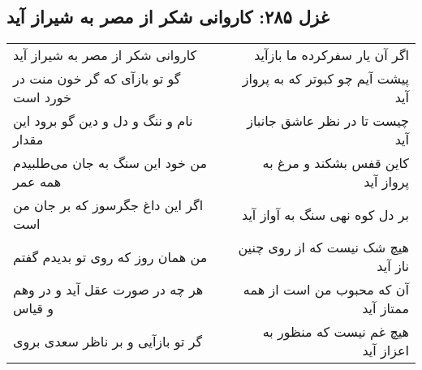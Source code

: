 \begin{center}
\section*{غزل ۲۸۵: کاروانی شکر از مصر به شیراز آید}
\label{sec:285}
\begin{longtable}{l p{0.5cm} r}
کاروانی شکر از مصر به شیراز آید
&&
اگر آن یار سفرکرده ما بازآید
\\
گو تو بازآی که گر خون منت در خورد است
&&
پیشت آیم چو کبوتر که به پرواز آید
\\
نام و ننگ و دل و دین گو برود این مقدار
&&
چیست تا در نظر عاشق جانباز آید
\\
من خود این سنگ به جان می‌طلبیدم همه عمر
&&
کاین قفس بشکند و مرغ به پرواز آید
\\
اگر این داغ جگرسوز که بر جان من است
&&
بر دل کوه نهی سنگ به آواز آید
\\
من همان روز که روی تو بدیدم گفتم
&&
هیچ شک نیست که از روی چنین ناز آید
\\
هر چه در صورت عقل آید و در وهم و قیاس
&&
آن که محبوب من است از همه ممتاز آید
\\
گر تو بازآیی و بر ناظر سعدی بروی
&&
هیچ غم نیست که منظور به اعزاز آید
\\
\end{longtable}
\end{center}
